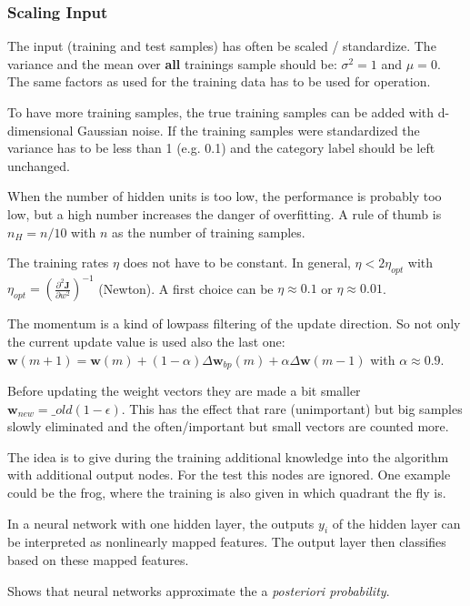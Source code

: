   \subsubsection{Scaling Input}
  The input (training and test samples) has often be scaled / standardize. The variance and the mean over \textbf{all} trainings sample should be: 
  $\sigma^2=1$ and $\mu=0$. The same factors as used for the training data has to be used for operation.
  
  
 
 To have more training samples, the true training samples can be added with d-dimensional Gaussian noise.
 If the training samples were standardized the variance has to be less than 1 (e.g. 0.1) and the category label should be left unchanged.
 
 When the number of hidden units is too low, the performance is probably too low, but a high number 
 increases the danger of overfitting. A rule of thumb is $n_H = n/10$ with $n$ as the number of training samples.
 
 The training rates $\eta$ does not have to be constant. In general,  $\eta < 2\eta_{opt}$ with $\eta_{opt}= \left( \frac{\partial^2\bm J}{\partial w^2} \right)^{-1}$ (Newton). 
 A first choice can be $\eta \approx 0.1$ or $\eta \approx 0.01$.
 
 The momentum is a kind of lowpass filtering of the update direction. So not only the current update value is used also the last one:\\
 $\bm w(m+1)= \bm w(m) +(1-\alpha) \Delta\bm w_{bp}(m) + \alpha \Delta \bm w(m-1)$ with $\alpha \approx 0.9$.
 
 Before updating the weight vectors they are made a bit smaller $\bm w_{new}= \bm _{old}(1-\epsilon)$. 
 This has the effect that rare (unimportant) but big samples slowly eliminated and the often/important but small vectors are counted more.
 
 The idea is to give during the training additional knowledge into the algorithm with additional output nodes. For the test this nodes are ignored. 
 One example could be the frog, where the training is also given in which quadrant the fly is.
 

  In a neural network with one hidden layer, the outputs $y_i$ of the hidden layer can be interpreted as nonlinearly mapped features.
  The output layer then classifies based on these mapped features. 

 Shows that neural networks approximate the a \emph{posteriori probability}.
 